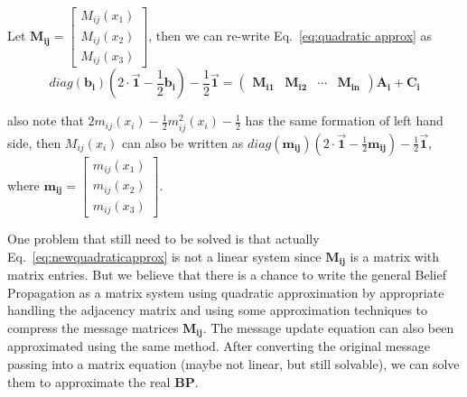 Let $\mathbf{M_{ij}} = \left[ \begin{array}{c}
M_{ij}(x_1) \\
M_{ij}(x_2) \\
M_{ij}(x_3) \end{array} \right]$, then we can re-write Eq.~\ref{eq:quadratic approx} as
\begin{equation}
\label{eq:newquadraticapprox}
diag(\mathbf{b_i})
(2\cdot\mathbf{\vec{1}}
-\frac{1}{2}\mathbf{b_i})-
\frac{1}{2}\mathbf{\vec{1}}
= \left( \begin{array}{cccc}
\mathbf{M_{i1}}&\mathbf{M_{i2}}&\cdots& \mathbf{M_{in}}\end{array} \right)\mathbf{A_i}+\mathbf{C_i}
\end{equation}

also note that $2m_{ij}(x_i)-\frac{1}{2}m_{ij}^2(x_i)-\frac{1}{2}$ has the same formation of left hand side, then $M_{ij}(x_i)$ can also be written as
$diag(\mathbf{m_{ij}})(2\cdot\mathbf{\vec{1}}-\frac{1}{2}\mathbf{m_{ij}})-\frac{1}{2}\mathbf{\vec{1}}$, where $\mathbf{m_{ij}}=\left[ \begin{array}{c}
m_{ij}(x_1) \\
m_{ij}(x_2) \\
m_{ij}(x_3) \end{array} \right]$.

One problem that still need to be solved is that actually Eq.~\ref{eq:newquadraticapprox} is not a linear system since $\mathbf{M_{ij}}$ is a matrix with matrix entries. But we believe that there is a chance to write the general Belief Propagation as a matrix system using quadratic approximation by appropriate handling the adjacency matrix and using some approximation techniques to compress the message matrices $\mathbf{M_{ij}}$. The message update equation can also been approximated using the same method. After converting the original message passing into a matrix equation (maybe not linear, but still solvable), we can solve them to approximate the real \textbf{BP}.

